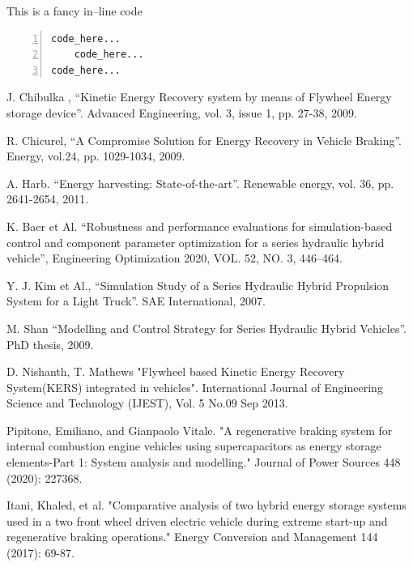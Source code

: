 \documentclass[11pt]{article}
\begin{document}

\vspace{4cm}
This is a fancy in--line code
\singlespacing
\begin{Verbatim}[tabsize = 4, frame = lines, numbers = left]
code_here...
	code_here...
code_here...
\end{Verbatim}
\onehalfspacing


\begin{thebibliography}{3}
	
	J. Chibulka , “Kinetic Energy Recovery system by means of Flywheel Energy 		    storage device”. 
	Advanced Engineering, vol. 3, issue 1, pp. 27-38, 2009.
	
	R. Chicurel, “A Compromise Solution for Energy Recovery in Vehicle Braking”.      	Energy, vol.24, pp. 1029-1034, 2009.
	
	A. Harb. “Energy harvesting: State-of-the-art”. 
	Renewable energy, vol. 36, pp. 2641-2654, 2011.
	
	K. Baer et Al. “Robustness and performance evaluations for simulation-based 		control and component parameter optimization for a series hydraulic hybrid 			vehicle”,  Engineering Optimization 2020, VOL. 52, NO. 3, 446–464.	
	
	Y. J. Kim et Al., “Simulation Study of a Series Hydraulic Hybrid Propulsion 		System for a Light Truck”. SAE International, 2007.
	
	M. Shan “Modelling and Control Strategy for Series Hydraulic Hybrid 				Vehicles”.  PhD thesis, 2009.
	
	D. Nishanth, T. Mathews "Flywheel based Kinetic Energy Recovery System(KERS) integrated in vehicles". International Journal of Engineering Science and Technology (IJEST), Vol. 5 No.09 Sep 2013.
	
	Pipitone, Emiliano, and Gianpaolo Vitale. "A regenerative braking system for internal combustion engine vehicles using supercapacitors as energy storage elements-Part 1: System analysis and modelling." Journal of Power Sources 448 (2020): 227368.
	
	Itani, Khaled, et al. "Comparative analysis of two hybrid energy storage systems used in a two front wheel driven electric vehicle during extreme start-up and regenerative braking operations." Energy Conversion and Management 144 (2017): 69-87.
	
	
	
\end{thebibliography}
\end{document}
